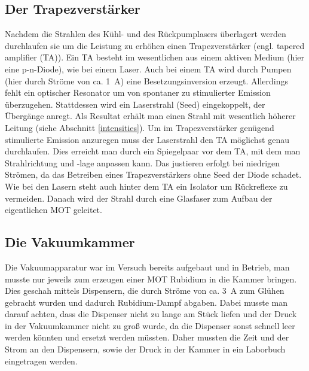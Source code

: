 \documentclass[12pt, a4paper]{article}
\begin{document}
  \subsection{Der Trapezverstärker}
    Nachdem die Strahlen des Kühl- und des Rückpumplasers überlagert werden durchlaufen
    sie um die Leistung zu erhöhen einen Trapezverstärker (engl. tapered amplifier
    (TA)). Ein TA besteht im wesentlichen aus einem aktiven Medium (hier eine
    p-n-Diode), wie bei einem Laser. Auch bei einem TA wird durch Pumpen (hier durch
    Ströme von ca. \SI{1}{\A}) eine Besetzungsinversion erzeugt. Allerdings fehlt ein
    optischer Resonator um von spontaner zu stimulierter Emission überzugehen.
    Stattdessen wird ein Laserstrahl (Seed) eingekoppelt, der Übergänge anregt. Als
    Resultat erhält man einen Strahl mit wesentlich höherer Leitung (siehe Abschnitt
    \ref{intensities}). Um im Trapezverstärker genügend stimulierte Emission anzuregen
    muss der Laserstrahl den TA möglichst genau durchlaufen. Dies erreicht man durch
    ein Spiegelpaar vor dem TA, mit dem man Strahlrichtung und -lage anpassen kann. Das
    justieren erfolgt bei niedrigen Strömen, da das Betreiben eines Trapezverstärkers
    ohne Seed der Diode schadet. Wie bei den Lasern steht auch hinter dem TA ein
    Isolator um Rückreflexe zu vermeiden. Danach wird der Strahl durch eine Glasfaser
    zum Aufbau der eigentlichen MOT geleitet.
  \subsection{Die Vakuumkammer}
    Die Vakuumapparatur war im Versuch bereits aufgebaut und in Betrieb, man musste nur
    jeweils zum erzeugen einer MOT Rubidium in die Kammer bringen. Dies geschah mittels
    Dispensern, die durch Ströme von ca. \SI{3}{\A} zum Glühen gebracht wurden und
    dadurch Rubidium-Dampf abgaben. Dabei musste man darauf achten, dass die Dispenser
    nicht zu lange am Stück liefen und der Druck in der Vakuumkammer nicht zu groß
    wurde, da die Dispenser sonst schnell leer werden könnten und ersetzt werden
    müssten. Daher mussten die Zeit und der Strom an den Dispensern, sowie der Druck in
    der Kammer in ein Laborbuch eingetragen werden.
\end{document}
